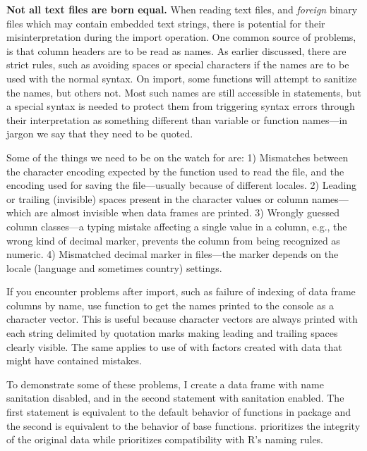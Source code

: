 \documentclass[krantz2]{krantz}\usepackage{knitr}
\begin{document}
\begin{explainbox}
\textbf{Not all text files are born equal.} When reading text files, and \emph{foreign} binary files which may contain embedded text strings, there is potential for their misinterpretation during the import operation. One common source of problems, is that column headers are to be read as \Rlang names. As earlier discussed, there are strict rules, such as avoiding spaces or special characters if the names are to be used with the normal syntax. On import, some functions will attempt to sanitize the names, but others not. Most such names are still accessible in \Rlang statements, but a special syntax is needed to protect them from triggering syntax errors through their interpretation as something different than variable or function names---in \Rlang jargon we say that they need to be quoted.

Some of the things we need to be on the watch for are:
1) Mismatches between the character encoding expected by the function used to read the file, and the encoding used for saving the file---usually because of different locales.
2) Leading or trailing (invisible) spaces present in the character values or column names---which are almost invisible when data frames are printed.
3) Wrongly guessed column classes---a typing mistake affecting a single value in a column, e.g.,  the wrong kind of decimal marker, prevents the column from being recognized as numeric.
4) Mismatched decimal marker in  files---the marker depends on the locale (language and sometimes country) settings.

If you encounter problems after import, such as failure of indexing of data frame columns by name, use function  to get the names printed to the console as a character vector. This is useful because character vectors are always printed with each string delimited by quotation marks making leading and trailing spaces clearly visible. The same applies to use of  with factors created with data that might have contained mistakes.

To demonstrate some of these problems, I create a data frame with name sanitation disabled, and in the second statement with sanitation enabled. The first statement is equivalent to the default behavior of functions in package  and the second is equivalent to the behavior of base \Rlang functions.  prioritizes the integrity of the original data while \Rlang prioritizes compatibility with R's naming rules.


\end{explainbox}
\end{document}
